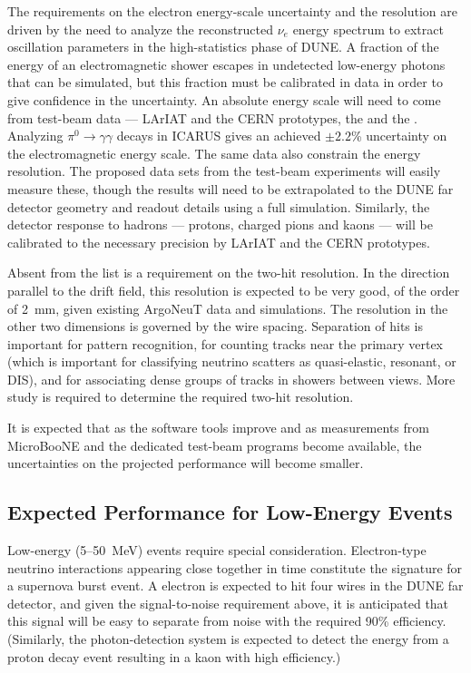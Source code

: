The requirements on the electron energy-scale uncertainty and the
resolution are driven by the need to analyze the reconstructed $\nu_e$
energy spectrum to extract oscillation parameters in the
high-statistics phase of DUNE.  A fraction of the energy of an
electromagnetic shower escapes in undetected low-energy photons that
can be simulated, but this fraction must be calibrated in data in order to give
confidence in the uncertainty.  An absolute energy scale will need to
come from test-beam data --- LArIAT and the CERN prototypes, the
\cernsingleproto{} and the \cerndualproto.  Analyzing
$\pi^0\rightarrow\gamma\gamma$ decays in ICARUS\cite{ICARUS-pizero}
gives an achieved $\pm 2.2$\% uncertainty on the electromagnetic
energy scale.  The same data also constrain the energy resolution.
The proposed data sets from the test-beam experiments will easily
measure these, though the results will need to be extrapolated to the
DUNE far detector geometry and readout details using a full
simulation.  Similarly, the detector response to hadrons --- protons,
charged pions and kaons --- will be calibrated to the necessary precision
by LArIAT and the CERN prototypes.


Absent from the list is a requirement on the two-hit resolution.  In the
direction parallel to the drift field, this resolution is expected to
be very good, of the order of 2~mm, given existing ArgoNeuT data and
simulations.  The resolution in the other two dimensions is governed
by the wire spacing.  Separation of hits is important for pattern
recognition, for counting tracks near the primary vertex (which is
important for classifying neutrino scatters as quasi-elastic,
resonant, or DIS), and for associating dense groups of tracks in
showers between views.  More study is required to determine
the required two-hit resolution.

It is expected that as the software tools improve and as measurements
from MicroBooNE and the dedicated test-beam programs become
available, the uncertainties on the projected performance will become
smaller.

\subsection{Expected Performance for Low-Energy Events}\label{sec:detectors-fd-ref-perf-lowe}

Low-energy (5--50~MeV) events require special consideration.
Electron-type neutrino interactions appearing close together in time
constitute the signature for a supernova burst event.  A  electron
is expected to hit four wires in the DUNE far detector, and given the
signal-to-noise requirement above, it is anticipated that this signal
will be easy to separate from noise with the required 90\% efficiency.
(Similarly, the photon-detection system is expected to detect the energy
from a proton decay event resulting in a  kaon with high
efficiency.)

